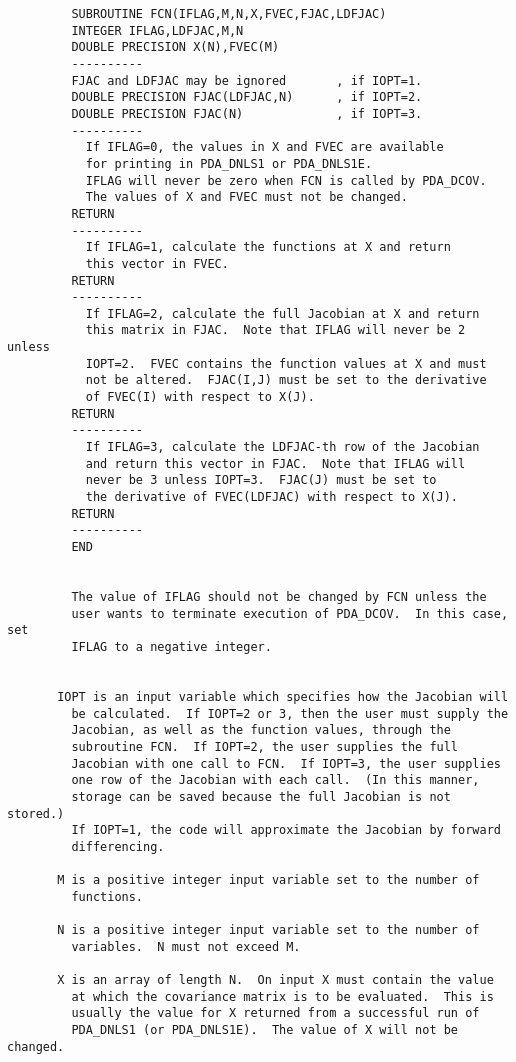 \begin{verbatim}
         SUBROUTINE FCN(IFLAG,M,N,X,FVEC,FJAC,LDFJAC)
         INTEGER IFLAG,LDFJAC,M,N
         DOUBLE PRECISION X(N),FVEC(M)
         ----------
         FJAC and LDFJAC may be ignored       , if IOPT=1.
         DOUBLE PRECISION FJAC(LDFJAC,N)      , if IOPT=2.
         DOUBLE PRECISION FJAC(N)             , if IOPT=3.
         ----------
           If IFLAG=0, the values in X and FVEC are available
           for printing in PDA_DNLS1 or PDA_DNLS1E.
           IFLAG will never be zero when FCN is called by PDA_DCOV.
           The values of X and FVEC must not be changed.
         RETURN
         ----------
           If IFLAG=1, calculate the functions at X and return
           this vector in FVEC.
         RETURN
         ----------
           If IFLAG=2, calculate the full Jacobian at X and return
           this matrix in FJAC.  Note that IFLAG will never be 2 unless
           IOPT=2.  FVEC contains the function values at X and must
           not be altered.  FJAC(I,J) must be set to the derivative
           of FVEC(I) with respect to X(J).
         RETURN
         ----------
           If IFLAG=3, calculate the LDFJAC-th row of the Jacobian
           and return this vector in FJAC.  Note that IFLAG will
           never be 3 unless IOPT=3.  FJAC(J) must be set to
           the derivative of FVEC(LDFJAC) with respect to X(J).
         RETURN
         ----------
         END


         The value of IFLAG should not be changed by FCN unless the
         user wants to terminate execution of PDA_DCOV.  In this case, set
         IFLAG to a negative integer.


       IOPT is an input variable which specifies how the Jacobian will
         be calculated.  If IOPT=2 or 3, then the user must supply the
         Jacobian, as well as the function values, through the
         subroutine FCN.  If IOPT=2, the user supplies the full
         Jacobian with one call to FCN.  If IOPT=3, the user supplies
         one row of the Jacobian with each call.  (In this manner,
         storage can be saved because the full Jacobian is not stored.)
         If IOPT=1, the code will approximate the Jacobian by forward
         differencing.

       M is a positive integer input variable set to the number of
         functions.

       N is a positive integer input variable set to the number of
         variables.  N must not exceed M.

       X is an array of length N.  On input X must contain the value
         at which the covariance matrix is to be evaluated.  This is
         usually the value for X returned from a successful run of
         PDA_DNLS1 (or PDA_DNLS1E).  The value of X will not be changed.


\end{verbatim}
